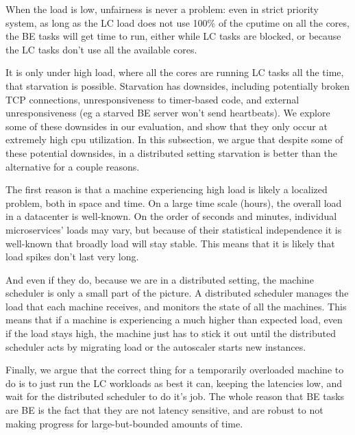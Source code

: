 When the load is low, unfairness is never a problem: even in strict priority
system, as long as the LC load does not use 100\% of the cputime on all the
cores, the BE tasks will get time to run, either while LC tasks are blocked, or
because the LC tasks don't use all the available cores.

It is only under high load, where all the cores are running LC tasks all the
time, that starvation is possible. Starvation has downsides, including
potentially broken TCP connections, unresponsiveness to timer-based code, and
external unresponsiveness (eg a starved BE server won't send heartbeats). We
explore some of these downsides in our evaluation, and show that they only occur
at extremely high cpu utilization. In this subsection, we argue that despite
some of these potential downsides, in a distributed setting starvation is better
than the alternative for a couple reasons.

The first reason is that a machine experiencing high load is likely a localized
problem, both in space and time. On a large time scale (hours), the overall load
in a datacenter is well-known. On the order of seconds and minutes, individual
microservices' loads may vary, but because of their statistical independence it
is well-known that broadly load will stay stable. This means that it is likely
that load spikes don't last very long.

And even if they do, because we are in a distributed setting, the machine
scheduler is only a small part of the picture. A distributed scheduler manages
the load that each machine receives, and monitors the state of all the machines.
This means that if a machine is experiencing a much higher than expected load,
even if the load stays high, the machine just has to stick it out until the
distributed scheduler acts by migrating load or the autoscaler starts new
instances.

Finally, we argue that the correct thing for a temporarily overloaded machine to
do is to just run the LC workloads as best it can, keeping the latencies low,
and wait for the distributed scheduler to do it's job. The whole reason that BE
tasks are BE is the fact that they are not latency sensitive, and are robust to
not making progress for large-but-bounded amounts of time.
